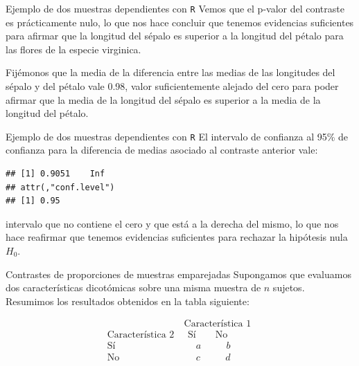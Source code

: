 \documentclass[
  ignorenonframetext,
]{beamer}
\newenvironment{Shaded}{\begin{snugshade}}{\end{snugshade}}
\newcommand{\DataTypeTok}[1]{\textcolor[rgb]{0.13,0.29,0.53}{#1}}
\newcommand{\KeywordTok}[1]{\textcolor[rgb]{0.13,0.29,0.53}{\textbf{#1}}}
\newcommand{\NormalTok}[1]{#1}
\newcommand{\OperatorTok}[1]{\textcolor[rgb]{0.81,0.36,0.00}{\textbf{#1}}}
\newcommand{\OtherTok}[1]{\textcolor[rgb]{0.56,0.35,0.01}{#1}}
\newcommand{\StringTok}[1]{\textcolor[rgb]{0.31,0.60,0.02}{#1}}
\begin{document}
\begin{frame}{Ejemplo de dos muestras dependientes con \texttt{R}}
\protect\hypertarget{ejemplo-de-dos-muestras-dependientes-con-r-3}{}
Vemos que el p-valor del contraste es prácticamente nulo, lo que nos
hace concluir que tenemos evidencias suficientes para afirmar que la
longitud del sépalo es superior a la longitud del pétalo para las flores
de la especie virginica.

Fijémonos que la media de la diferencia entre las medias de las
longitudes del sépalo y del pétalo vale 0.98, valor suficientemente
alejado del cero para poder afirmar que la media de la longitud del
sépalo es superior a la media de la longitud del pétalo.
\end{frame}

\begin{frame}[fragile]{Ejemplo de dos muestras dependientes con
\texttt{R}}
\protect\hypertarget{ejemplo-de-dos-muestras-dependientes-con-r-4}{}
El intervalo de confianza al 95\% de confianza para la diferencia de
medias asociado al contraste anterior vale:

\begin{Shaded}
\end{Shaded}

\begin{verbatim}
## [1] 0.9051    Inf
## attr(,"conf.level")
## [1] 0.95
\end{verbatim}

intervalo que no contiene el cero y que está a la derecha del mismo, lo
que nos hace reafirmar que tenemos evidencias suficientes para rechazar
la hipótesis nula \(H_0\).
\end{frame}

\begin{frame}{Contrastes de proporciones de muestras emparejadas}
\protect\hypertarget{contrastes-de-proporciones-de-muestras-emparejadas}{}
Supongamos que evaluamos dos características dicotómicas sobre una misma
muestra de \(n\) sujetos. Resumimos los resultados obtenidos en la tabla
siguiente:

\[
\begin{array}{r|c}
 & \ \mbox{Característica 1}\  \\
\mbox{Característica 2} &\ \ \, \mbox{Sí}\qquad \mbox{No}\\\hline
 \mbox{Sí} & \quad\ \  a \qquad \ \ \, b\quad  \\
 \mbox{No} & \quad\ \   c  \qquad \ \ \, d\quad
 \end{array}
\]
\end{frame}
\end{document}
